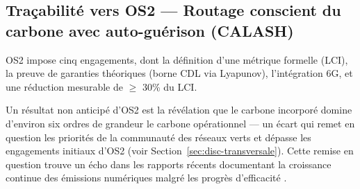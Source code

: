 \subsection{Traçabilité vers OS2 --- Routage conscient du carbone avec auto-guérison (CALASH)}

OS2 impose cinq engagements, dont la définition d'une métrique formelle (LCI), la preuve de garanties théoriques (borne CDL via Lyapunov), l'intégration 6G, et une réduction mesurable de $\geq$ 30\% du LCI.

\begin{table}[htbp]
\centering
\caption{Traçabilité des résultats CALASH vers les sous-objectifs OS2.}
\label{tab:tracabilite-os2}
\end{table}

Un résultat non anticipé d'OS2 est la révélation que le carbone incorporé domine d'environ six ordres de grandeur le carbone opérationnel --- un écart qui remet en question les priorités de la communauté des réseaux verts et dépasse les engagements initiaux d'OS2 (voir Section~\ref{sec:disc-transversale}). Cette remise en question trouve un écho dans les rapports récents documentant la croissance continue des émissions numériques malgré les progrès d'efficacité \cite{itu_ict2025}.

